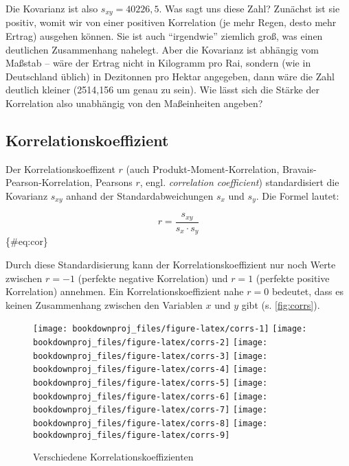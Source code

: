 \documentclass[
  ngerman,
]{article}
\begin{document}
Die Kovarianz ist also \(s_{xy}=40226,5\). Was sagt uns diese Zahl? Zunächst ist sie positiv, womit wir von einer positiven Korrelation (je mehr Regen, desto mehr Ertrag) ausgehen können. Sie ist auch ``irgendwie'' ziemlich groß, was einen deutlichen Zusammenhang nahelegt. Aber die Kovarianz ist abhängig vom Maßstab -- wäre der Ertrag nicht in Kilogramm pro Rai, sondern (wie in Deutschland üblich) in Dezitonnen pro Hektar angegeben, dann wäre die Zahl deutlich kleiner (2514,156 um genau zu sein). Wie lässt sich die Stärke der Korrelation also unabhängig von den Maßeinheiten angeben?

\hypertarget{korrelationskoeffizient}{%
\subsection{Korrelationskoeffizient}\label{korrelationskoeffizient}}

Der Korrelationskoeffizent \(r\) (auch Produkt-Moment-Korrelation, Bravais-Pearson-Korrelation, Pearsons \(r\), engl. \emph{correlation coefficient}) standardisiert die Kovarianz \(s_{xy}\) anhand der Standardabweichungen \(s_x\) und \(s_y\). Die Formel lautet:

\[
r=\frac{s_{xy}}{s_x\cdot s_y}
\]\{\#eq:cor\}

Durch diese Standardisierung kann der Korrelationskoeffizient nur noch Werte zwischen \(r=-1\) (perfekte negative Korrelation) und \(r=1\) (perfekte positive Korrelation) annehmen. Ein Korrelationskoeffizient nahe \(r=0\) bedeutet, dass es keinen Zusammenhang zwischen den Variablen \(x\) und \(y\) gibt (s. \autoref{fig:corrs}).

\begin{figure}[h]

{\centering \texttt{[image: bookdownproj\_files/figure-latex/corrs-1]} \texttt{[image: bookdownproj\_files/figure-latex/corrs-2]} \texttt{[image: bookdownproj\_files/figure-latex/corrs-3]} \texttt{[image: bookdownproj\_files/figure-latex/corrs-4]} \texttt{[image: bookdownproj\_files/figure-latex/corrs-5]} \texttt{[image: bookdownproj\_files/figure-latex/corrs-6]} \texttt{[image: bookdownproj\_files/figure-latex/corrs-7]} \texttt{[image: bookdownproj\_files/figure-latex/corrs-8]} \texttt{[image: bookdownproj\_files/figure-latex/corrs-9]} 

}

\caption{Verschiedene Korrelationskoeffizienten}\label{fig:corrs}
\end{figure}
\end{document}
